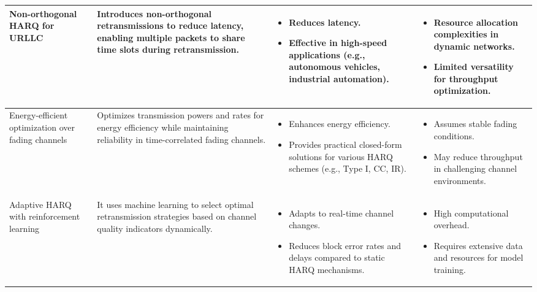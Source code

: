 \documentclass[sn-mathphys-num]{sn-jnl}
\theoremstyle{thmstyleone}
\theoremstyle{thmstyletwo}%
\theoremstyle{thmstylethree}%
\begin{document}
\begin{longtable}{|>{\centering\arraybackslash}m{3.2cm}|>{\centering\arraybackslash}m{4.3cm}|>{\centering\arraybackslash}m{3.75cm}|>{\centering\arraybackslash}m{3.75cm}|}
Non-orthogonal HARQ for URLLC \cite{r28}& Introduces non-orthogonal retransmissions to reduce latency, enabling multiple packets to share time slots during retransmission. & 
\begin{itemize}
    \item Reduces latency.
    \item Effective in high-speed applications (e.g., autonomous vehicles, industrial automation).
\end{itemize} & 
\begin{itemize}
    \item Resource allocation complexities in dynamic networks.
    \item Limited versatility for throughput optimization.
\end{itemize} \\ 
\hline

Energy-efficient optimization over fading channels \cite{r29} & Optimizes transmission powers and rates for energy efficiency while maintaining reliability in time-correlated fading channels. & 
\begin{itemize}
    \item Enhances energy efficiency.
    \item Provides practical closed-form solutions for various HARQ schemes (e.g., Type I, CC, IR).
\end{itemize} & 
\begin{itemize}
    \item Assumes stable fading conditions.
    \item May reduce throughput in challenging channel environments.
\end{itemize} \\ 
\hline

Adaptive HARQ with reinforcement learning \cite{r30} & It uses machine learning to select optimal retransmission strategies based on channel quality indicators dynamically. & 
\begin{itemize}
    \item Adapts to real-time channel changes.
    \item Reduces block error rates and delays compared to static HARQ mechanisms.
\end{itemize} & 
\begin{itemize}
    \item High computational overhead.
    \item Requires extensive data and resources for model training.
\end{itemize} \\ 
\hline


\end{longtable}
\end{document}
